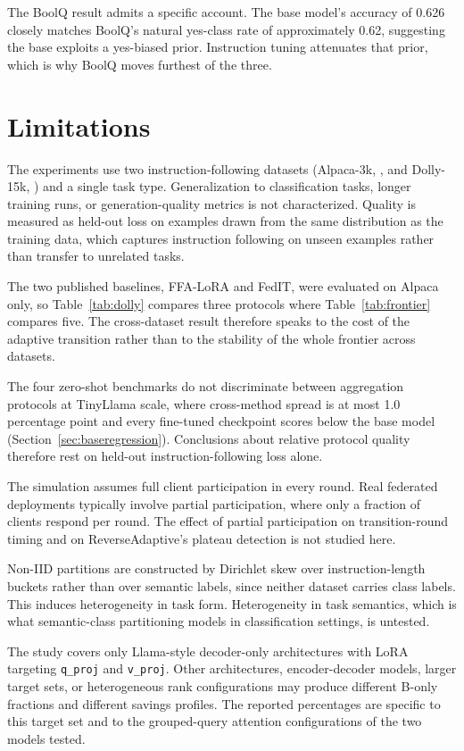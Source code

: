 The BoolQ result admits a specific account. The base model's accuracy of 0.626 closely matches BoolQ's natural yes-class rate of approximately 0.62, suggesting the base exploits a yes-biased prior. Instruction tuning attenuates that prior, which is why BoolQ moves furthest of the three.

\section{Limitations}
\label{sec:limitations}

The experiments use two instruction-following datasets (Alpaca-3k, \citealt{taori2023alpaca}, and Dolly-15k, \citealt{dolly2023}) and a single task type. Generalization to classification tasks, longer training runs, or generation-quality metrics is not characterized. Quality is measured as held-out loss on examples drawn from the same distribution as the training data, which captures instruction following on unseen examples rather than transfer to unrelated tasks.

The two published baselines, FFA-LoRA and FedIT, were evaluated on Alpaca only, so Table~\ref{tab:dolly} compares three protocols where Table~\ref{tab:frontier} compares five. The cross-dataset result therefore speaks to the cost of the adaptive transition rather than to the stability of the whole frontier across datasets.

The four zero-shot benchmarks do not discriminate between aggregation protocols at TinyLlama scale, where cross-method spread is at most 1.0 percentage point and every fine-tuned checkpoint scores below the base model (Section~\ref{sec:baseregression}). Conclusions about relative protocol quality therefore rest on held-out instruction-following loss alone.

The simulation assumes full client participation in every round. Real federated deployments typically involve partial participation, where only a fraction of clients respond per round. The effect of partial participation on transition-round timing and on ReverseAdaptive's plateau detection is not studied here.

Non-IID partitions are constructed by Dirichlet skew over instruction-length buckets rather than over semantic labels, since neither dataset carries class labels. This induces heterogeneity in task form. Heterogeneity in task semantics, which is what semantic-class partitioning models in classification settings, is untested.

The study covers only Llama-style decoder-only architectures with LoRA targeting \texttt{q\_proj} and \texttt{v\_proj}. Other architectures, encoder-decoder models, larger target sets, or heterogeneous rank configurations may produce different B-only fractions and different savings profiles. The reported percentages are specific to this target set and to the grouped-query attention configurations of the two models tested.

